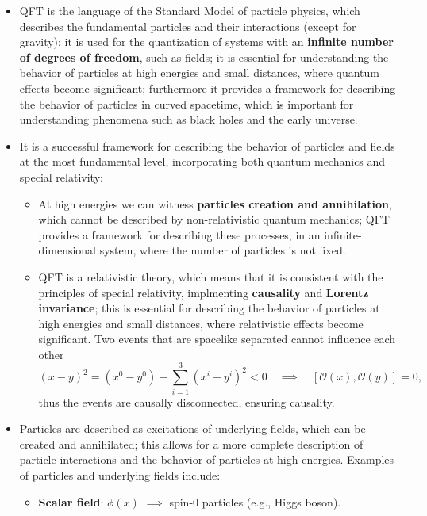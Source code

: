 \begin{itemize}
    \item QFT is the language of the Standard Model of particle physics, which describes the fundamental particles and their interactions (except for gravity); it is used for the quantization of systems with an \textbf{infinite number of degrees of freedom}, such as fields; it is essential for understanding the behavior of particles at high energies and small distances, where quantum effects become significant; furthermore it provides a framework for describing the behavior of particles in curved spacetime, which is important for understanding phenomena such as black holes and the early universe.
    \item It is a successful framework for describing the behavior of particles and fields at the most fundamental level, incorporating both quantum mechanics and special relativity:
          \begin{itemize}
              \item At high energies we can witness \textbf{particles creation and annihilation}, which cannot be described by non-relativistic quantum mechanics; QFT provides a framework for describing these processes, in an infinite-dimensional system, where the number of particles is not fixed.
              \item QFT is a relativistic theory, which means that it is consistent with the principles of special relativity, implmenting \textbf{causality} and \textbf{Lorentz invariance}; this is essential for describing the behavior of particles at high energies and small distances, where relativistic effects become significant. Two events that are spacelike separated cannot influence each other
                    \[
                        (x-y)^2 = (x^0-y^0) - \sum_{i=1}^3 (x^i-y^i)^2 < 0 \quad \implies \quad [\mathcal{O}(x), \mathcal{O}(y)] = 0,
                    \]
                    thus the events are causally disconnected, ensuring causality.
          \end{itemize}
    \item Particles are described as excitations of underlying fields, which can be created and annihilated; this allows for a more complete description of particle interactions and the behavior of particles at high energies. Examples of particles and underlying fields include:
          \begin{itemize}
              \item \textbf{Scalar field}: \(\phi(x)\) \(\implies\) spin-0 particles (e.g., Higgs boson).

\end{itemize}
\end{itemize}
